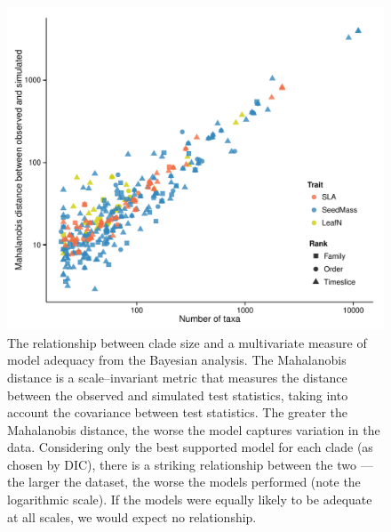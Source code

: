 \documentclass[a4paper,11pt]{article}
\begin{document}
\begin{figure}[p]
  \centering
  \includegraphics[scale=0.8]{figs/ad-size-bayes}
  \caption{The relationship between clade size and a multivariate measure of model adequacy from the Bayesian analysis. The Mahalanobis distance is a scale--invariant metric that measures the distance between the observed and simulated test statistics, taking into account the covariance between test statistics. The greater the Mahalanobis distance, the worse the model captures variation in the data. Considering only the best supported model for each clade (as chosen by DIC), there is a striking relationship between the two --- the larger the dataset, the worse the models performed (note the logarithmic scale). If the models were equally likely to be adequate at all scales, we would expect no relationship.}
  \label{fig:supp-size-adequacy}
\end{figure}
\end{document}
